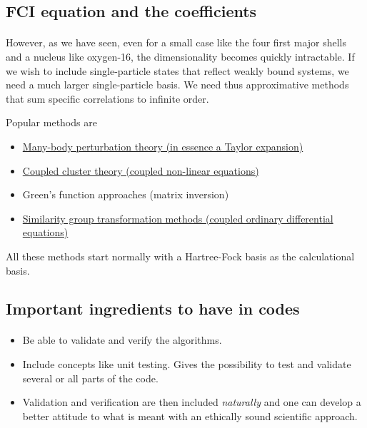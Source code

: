 \subsection*{FCI equation and the coefficients}

\paragraph{}

However, as we have seen, even for a small case like the four first major shells and a nucleus like oxygen-16, the dimensionality becomes quickly intractable. If we wish to include single-particle states that reflect weakly bound systems, we need a much larger single-particle basis. We need thus approximative methods that sum specific correlations to infinite order. 

Popular methods are
\begin{itemize}
\item \href{{http://www.sciencedirect.com/science/article/pii/0370157395000126}}{Many-body perturbation theory (in essence a Taylor expansion)}

\item \href{{http://iopscience.iop.org/article/10.1088/0034-4885/77/9/096302/meta}}{Coupled cluster theory (coupled non-linear equations)}

\item Green's function approaches (matrix inversion)

\item \href{{http://journals.aps.org/prl/abstract/10.1103/PhysRevLett.106.222502}}{Similarity group transformation methods (coupled ordinary differential equations)}
\end{itemize}

\noindent
All these methods start normally with a Hartree-Fock basis as the calculational basis.



\subsection*{Important ingredients to have in codes}

\paragraph{}

\begin{itemize}
\item Be able to validate and verify  the  algorithms. 

\item Include concepts like unit testing. Gives the possibility to test and validate several or all parts of the code.

\item Validation and verification are then included \emph{naturally} and one can develop a better attitude to what is meant with an ethically sound scientific approach.
\end{itemize}

